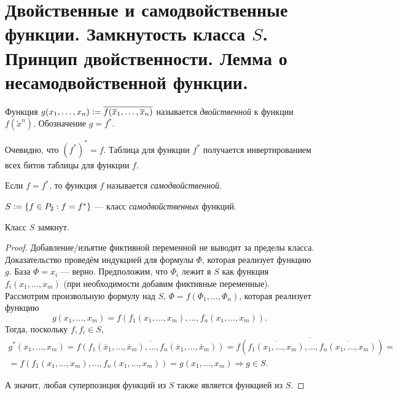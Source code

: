 \section{Двойственные и самодвойственные функции. Замкнутость класса $S$. Принцип двойственности. Лемма о несамодвойственной функции.}

\begin{definition}
    Функция $g(x_1, \ldots, x_n) \vcentcolon = \overline{f(\overline{x}_1, \ldots, \overline{x}_n)}$ называется \textit{двойственной} к функции $f(\widetilde{x}^n)$. Обозначение $g = f^\ast$.
\end{definition}

\begin{remark}
    Очевидно, что $(f^\ast)^\ast = f$. Таблица для функции $f^\ast$ получается инвертированием всех битов таблицы для функции $f$.
\end{remark}

\begin{definition}
    Если $f = f^\ast$, то функция $f$ называется \textit{самодвойственной}.
\end{definition}

\begin{definition}
    $S \vcentcolon = \{f \in P_2 : f = f^\ast\}$ --- класс \textit{самодвойственных} функций.
\end{definition}

\begin{theorem}
    Класс $S$ замкнут.
\end{theorem}

\begin{proof}
    Добавление/изъятие фиктивной переменной не выводит за пределы класса.\\ 
    Доказательство проведём индукцией для формулы $\Phi$, которая реализует функцию $g$. База $\Phi = x_i$ --- верно. Предположим, что $\Phi_i$ лежит в $S$ как функция $f_i(x_1,\ldots,x_m)$ (при необходимости добавим фиктивные переменные). Рассмотрим произвольную формулу над $S$, $\Phi = f(\Phi_1, \ldots, \Phi_n)$, которая реализует функцию
    \[
        g(x_1,\ldots, x_m) = f(f_1(x_1, \ldots, x_m), \ldots, f_n(x_1, \ldots, x_m)).
    \]
    Тогда, поскольку $f, f_i \in S$,
    \begin{multline*}
        g^\ast(x_1,\ldots, x_m) = \overline{f(f_1(\overline{x}_1, \ldots, \overline{x}_m), \ldots, f_n(\overline{x}_1, \ldots, \overline{x}_m))} = \overline{f(\overline{f_1(x_1, \ldots, x_m)}, \ldots, \overline{f_n(x_1, \ldots, x_m)})} = \\ = f(f_1(x_1, \ldots, x_m), \ldots, f_n(x_1, \ldots, x_m)) = g(x_1,\ldots, x_m) \Rightarrow g \in S.
    \end{multline*}
    
    А значит, любая суперпозиция функций из $S$ также является функцией из $S$.
\end{proof}

